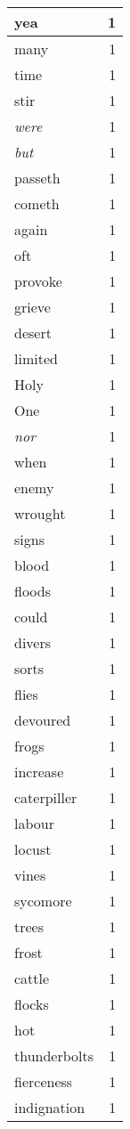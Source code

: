 \begin{center}
\begin{longtable}{l|r}
yea & 1\\ \hline 
many & 1\\ \hline 
time & 1\\ \hline 
stir & 1\\ \hline 
\emph{were} & 1\\ \hline 
\emph{but} & 1\\ \hline 
passeth & 1\\ \hline 
cometh & 1\\ \hline 
again & 1\\ \hline 
oft & 1\\ \hline 
provoke & 1\\ \hline 
grieve & 1\\ \hline 
desert & 1\\ \hline 
limited & 1\\ \hline 
Holy & 1\\ \hline 
One & 1\\ \hline 
\emph{nor} & 1\\ \hline 
when & 1\\ \hline 
enemy & 1\\ \hline 
wrought & 1\\ \hline 
signs & 1\\ \hline 
blood & 1\\ \hline 
floods & 1\\ \hline 
could & 1\\ \hline 
divers & 1\\ \hline 
sorts & 1\\ \hline 
flies & 1\\ \hline 
devoured & 1\\ \hline 
frogs & 1\\ \hline 
increase & 1\\ \hline 
caterpiller & 1\\ \hline 
labour & 1\\ \hline 
locust & 1\\ \hline 
vines & 1\\ \hline 
sycomore & 1\\ \hline 
trees & 1\\ \hline 
frost & 1\\ \hline 
cattle & 1\\ \hline 
flocks & 1\\ \hline 
hot & 1\\ \hline 
thunderbolts & 1\\ \hline 
fierceness & 1\\ \hline 
indignation & 1\\ \hline 

\end{longtable}
\end{center}
